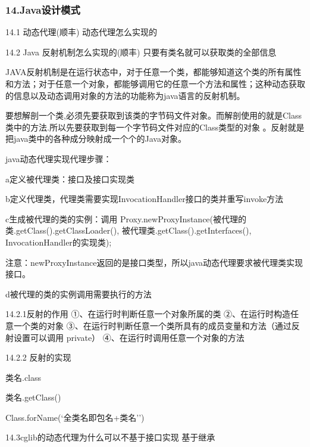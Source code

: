 \documentclass[UTF8]{ctexart}
\begin{document}
\subsubsection{14.Java设计模式}
14.1 动态代理(顺丰)
动态代理怎么实现的

14.2 Java 反射机制怎么实现的(顺丰)
只要有类名就可以获取类的全部信息

JAVA反射机制是在运行状态中，对于任意一个类，都能够知道这个类的所有属性和方法；对于任意一个对象，都能够调用它的任意一个方法和属性；这种动态获取的信息以及动态调用对象的方法的功能称为java语言的反射机制。

要想解剖一个类,必须先要获取到该类的字节码文件对象。而解剖使用的就是Class类中的方法.所以先要获取到每一个字节码文件对应的Class类型的对象 。反射就是把java类中的各种成分映射成一个个的Java对象。

java动态代理实现代理步骤：

a定义被代理类：接口及接口实现类

b定义代理类，代理类需要实现InvocationHandler接口的类并重写invoke方法

c生成被代理的类的实例：调用 Proxy.newProxyInstance(被代理的类.getClass().getClassLoader(), 被代理类.getClass().getInterfaces(), InvocationHandler的实现类);

注意：newProxyInstance返回的是接口类型，所以java动态代理要求被代理类实现接口。

d被代理的类的实例调用需要执行的方法

14.2.1反射的作用
①、在运行时判断任意一个对象所属的类
②、在运行时构造任意一个类的对象
③、在运行时判断任意一个类所具有的成员变量和方法（通过反射设置可以调用 private）
④、在运行时调用任意一个对象的方法

14.2.2 反射的实现

类名.class

类名.getClass()

Class.forName(‘全类名即包名+类名'’)

14.3cglib的动态代理为什么可以不基于接口实现
基于继承
\end{document}
